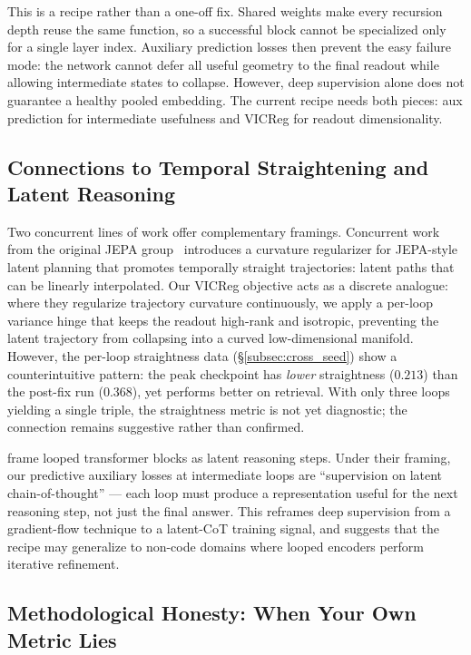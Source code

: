 This is a recipe rather than a one-off fix.  Shared weights make every
recursion depth reuse the same function, so a successful block cannot be
specialized only for a single layer index.  Auxiliary prediction losses
then prevent the easy failure mode: the network cannot defer all useful
geometry to the final readout while allowing intermediate states to
collapse.  However, deep supervision alone does not guarantee a healthy
pooled embedding.  The current recipe needs both pieces: aux prediction
for intermediate usefulness and VICReg for readout dimensionality.

\subsection{Connections to Temporal Straightening and Latent Reasoning}

Two concurrent lines of work offer complementary framings.
Concurrent work from the original JEPA
group~\citep{straightening2026} introduces a curvature regularizer for
JEPA-style latent planning that promotes temporally straight
trajectories: latent paths that can be linearly interpolated.  Our
VICReg objective acts as a discrete analogue: where they regularize
trajectory curvature continuously, we apply a per-loop variance hinge
that keeps the readout high-rank and isotropic, preventing the latent
trajectory from collapsing into a curved low-dimensional manifold.  However, the
per-loop straightness data (\S\ref{subsec:cross_seed}) show a
counterintuitive pattern: the peak checkpoint has \emph{lower}
straightness ($0.213$) than the post-fix run ($0.368$), yet performs
better on retrieval.  With only three loops yielding a single triple,
the straightness metric is not yet diagnostic; the connection remains
suggestive rather than confirmed.

\citet{jepareasoner2025} frame looped transformer blocks as latent
reasoning steps.  Under their framing, our predictive auxiliary
losses at intermediate loops are ``supervision on latent
chain-of-thought'' --- each loop must produce a representation useful
for the next reasoning step, not just the final answer.  This reframes
deep supervision from a gradient-flow technique to a latent-CoT
training signal, and suggests that the recipe may generalize to
non-code domains where looped encoders perform iterative refinement.

\subsection{Methodological Honesty: When Your Own Metric Lies}


